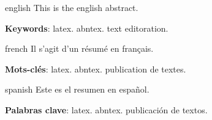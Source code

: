 \begin{resumo}[Abstract]
  \begin{otherlanguage*}{english}
    This is the english abstract.

    \vspace{\onelineskip}

    \noindent
    \textbf{Keywords}: latex. abntex. text editoration.
  \end{otherlanguage*}
\end{resumo}

\begin{resumo}[Résumé]
  \begin{otherlanguage*}{french}
    Il s'agit d'un résumé en français.

    \textbf{Mots-clés}: latex. abntex. publication de textes.
  \end{otherlanguage*}
\end{resumo}

\begin{resumo}[Resumen]
  \begin{otherlanguage*}{spanish}
    Este es el resumen en español.

    \textbf{Palabras clave}: latex. abntex. publicación de textos.
  \end{otherlanguage*}
\end{resumo}
